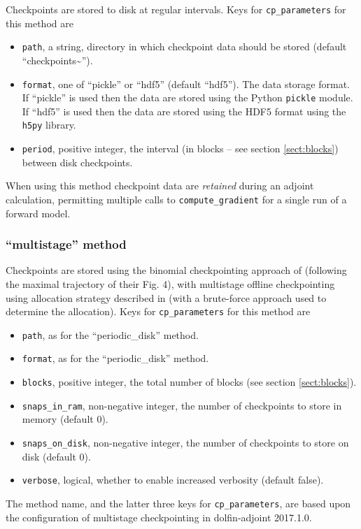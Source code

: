 \documentclass[11pt]{article}
\begin{document}
Checkpoints are stored to disk at regular intervals. Keys for
\texttt{cp\_parameters} for this method are
\begin{itemize}
  \item \texttt{path}, a string, directory in which checkpoint data should be
    stored (default ``checkpoints\textasciitilde'').
  \item \texttt{format}, one of ``pickle'' or ``hdf5'' (default ``hdf5''). The
    data storage format. If ``pickle'' is used then the data are stored using
    the Python \texttt{pickle} module. If ``hdf5'' is used then the data are
    stored using the HDF5 format \citep{hdf5} using the \texttt{h5py} library.
  \item \texttt{period}, positive integer, the interval (in blocks -- see
    section \ref{sect:blocks}) between disk checkpoints.
\end{itemize}

When using this method checkpoint data are \emph{retained} during an adjoint
calculation, permitting multiple calls to \texttt{compute\_gradient} for a
single run of a forward model.

\subsubsection{``multistage'' method}

Checkpoints are stored using the binomial checkpointing approach of
\citet{griewank2000} (following the maximal trajectory of their Fig. 4), with
multistage offline checkpointing using allocation strategy described in
\citet{stumm2009} (with a brute-force approach used to determine the
allocation). Keys for \texttt{cp\_parameters} for this method are
\begin{itemize}
  \item \texttt{path}, as for the ``periodic\_disk'' method.
  \item \texttt{format}, as for the ``periodic\_disk'' method.
  \item \texttt{blocks}, positive integer, the total number of blocks (see
    section \ref{sect:blocks}).
  \item \texttt{snaps\_in\_ram}, non-negative integer, the number of
    checkpoints to store in memory (default $0$).
  \item \texttt{snaps\_on\_disk}, non-negative integer, the number of
    checkpoints to store on disk (default $0$).
  \item \texttt{verbose}, logical, whether to enable increased verbosity
    (default false).
\end{itemize}
The method name, and the latter three keys for \texttt{cp\_parameters}, are
based upon the configuration of multistage checkpointing in dolfin-adjoint
2017.1.0.
\end{document}

